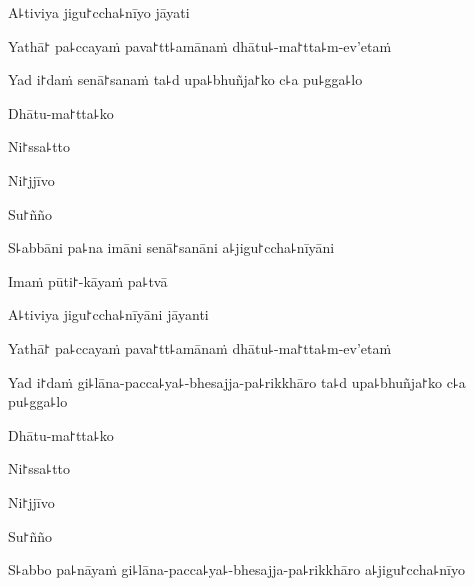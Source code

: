 A꜕tiviya jigu꜓ccha꜕nīyo jāyati


Yathā꜓ pa꜕ccayaṁ pava꜓tt꜕amānaṁ dhātu꜕-ma꜓tta꜕m-ev'etaṁ


Yad i꜓daṁ senā꜓sanaṁ ta꜕d upa꜕bhuñja꜓ko c꜕a pu꜕gga꜕lo


Dhātu-ma꜓tta꜕ko


Ni꜓ssa꜕tto


Ni꜓jjīvo


Su꜓ñño


S꜕abbāni pa꜕na imāni senā꜓sanāni a꜕jigu꜓ccha꜕nīyāni


\clearpage

Imaṁ pūti꜓-kāyaṁ pa꜕tvā


A꜕tiviya jigu꜓ccha꜕nīyāni jāyanti


Yathā꜓ pa꜕ccayaṁ pava꜓tt꜕amānaṁ dhātu꜕-ma꜓tta꜕m-ev'etaṁ


Yad i꜓daṁ gi꜕lāna-pacca꜕ya꜕-bhesajja-pa꜕rikkhāro ta꜕d upa꜕bhuñja꜓ko c꜕a pu꜕gga꜕lo


Dhātu-ma꜓tta꜕ko


Ni꜓ssa꜕tto


Ni꜓jjīvo


Su꜓ñño


S꜕abbo pa꜕nāyaṁ gi꜕lāna-pacca꜕ya꜕-bhesajja-pa꜕rikkhāro a꜕jigu꜓ccha꜕nīyo


